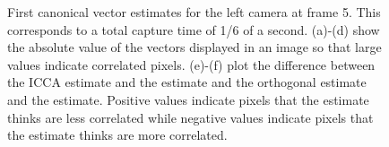 \begin{figure}
\begin{center}
{    }
    \caption{First canonical vector estimates for the left camera at frame 5. This corresponds
      to a total capture time of 1/6 of a second. (a)-(d) show the absolute value of the
      vectors displayed in an image so that large values indicate correlated
      pixels. (e)-(f) plot the difference between the ICCA estimate and the \iccap
      estimate and the orthogonal estimate and the \iccap estimate. Positive values
      indicate pixels that the \iccap estimate thinks are less correlated while negative
      values indicate pixels that the \iccap estimate thinks are more correlated. }
    \label{fig:chpt5:flashing2_1}
  \end{center}
\end{figure}

